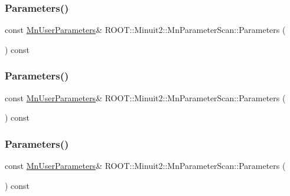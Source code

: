\subsubsection{\texorpdfstring{Parameters()}{Parameters()}\hspace{0.1cm}{\footnotesize\ttfamily [1/3]}}
{\footnotesize\ttfamily const \mbox{\hyperlink{classROOT_1_1Minuit2_1_1MnUserParameters}{Mn\+User\+Parameters}}\& R\+O\+O\+T\+::\+Minuit2\+::\+Mn\+Parameter\+Scan\+::\+Parameters (\begin{DoxyParamCaption}{ }\end{DoxyParamCaption}) const\hspace{0.3cm}{\ttfamily [inline]}}

\mbox{\label{classROOT_1_1Minuit2_1_1MnParameterScan_aacca13f3ec5fe5acd706dee93edb56d4}} 
\subsubsection{\texorpdfstring{Parameters()}{Parameters()}\hspace{0.1cm}{\footnotesize\ttfamily [2/3]}}
{\footnotesize\ttfamily const \mbox{\hyperlink{classROOT_1_1Minuit2_1_1MnUserParameters}{Mn\+User\+Parameters}}\& R\+O\+O\+T\+::\+Minuit2\+::\+Mn\+Parameter\+Scan\+::\+Parameters (\begin{DoxyParamCaption}{ }\end{DoxyParamCaption}) const\hspace{0.3cm}{\ttfamily [inline]}}

\mbox{\label{classROOT_1_1Minuit2_1_1MnParameterScan_aacca13f3ec5fe5acd706dee93edb56d4}} 
\subsubsection{\texorpdfstring{Parameters()}{Parameters()}\hspace{0.1cm}{\footnotesize\ttfamily [3/3]}}
{\footnotesize\ttfamily const \mbox{\hyperlink{classROOT_1_1Minuit2_1_1MnUserParameters}{Mn\+User\+Parameters}}\& R\+O\+O\+T\+::\+Minuit2\+::\+Mn\+Parameter\+Scan\+::\+Parameters (\begin{DoxyParamCaption}{ }\end{DoxyParamCaption}) const\hspace{0.3cm}{\ttfamily [inline]}}



